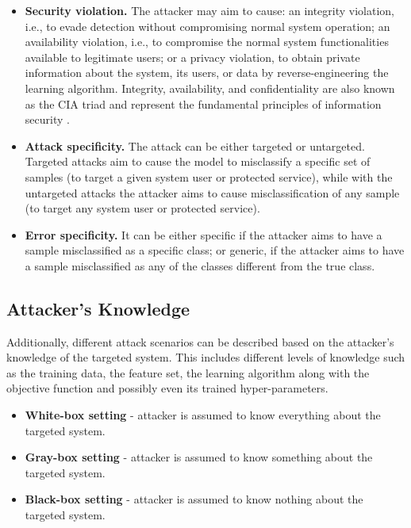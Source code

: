 \documentclass[10pt, conference, a4paper, final]{IEEEtran}
\begin{document}
\begin{itemize}
    \item \textbf{Security violation.} The attacker may aim to cause: an integrity violation, i.e., to evade detection without compromising normal system operation; an availability violation, i.e., to compromise the normal system functionalities available to legitimate users; or a privacy violation, to obtain private information about the system, its users, or data by reverse-engineering the learning algorithm. Integrity, availability, and confidentiality are also known as the CIA triad and represent the fundamental principles of information security \cite{Perrin}.
    
    \item \textbf{Attack specificity.} The attack can be either targeted or untargeted. Targeted attacks aim to cause the model to misclassify a specific set of samples (to target a given system user or protected service), while with the untargeted attacks the attacker aims to cause misclassification of any sample (to target any system user or protected service).
    
    \item \textbf{Error specificity.} It can be either specific if the attacker aims to have a sample misclassified as a specific class; or generic, if the attacker aims to have a sample misclassified as any of the classes different from the true class.
\end{itemize}

\subsection{Attacker’s Knowledge}

Additionally, different attack scenarios can be described based on the attacker’s knowledge of the targeted system. This includes different levels of knowledge such as the training data, the feature set, the learning algorithm along with the objective function and possibly even its trained hyper-parameters.

\begin{itemize}
    \item \textbf{White-box setting} - attacker is assumed to know everything about the targeted system.
    \item \textbf{Gray-box setting} - attacker is assumed to know something about the targeted system.
    \item \textbf{Black-box setting} - attacker is assumed to know nothing about the targeted system.
\end{itemize}
\end{document}
